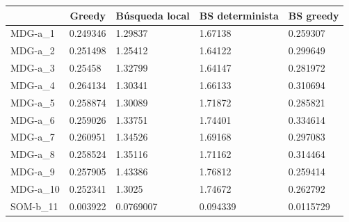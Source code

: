 \documentclass[11pt,a4paper]{article}
\begin{document}
	
	\begin{table}[H]
		\begin{tabular}{l|l|l|l|l|}
			\cline{2-5}
			& \multicolumn{1}{c|}{Greedy} & \multicolumn{1}{c|}{Búsqueda local} & \multicolumn{1}{c|}{BS determinista} & \multicolumn{1}{c|}{BS greedy} \\ \hline
			\multicolumn{1}{|l|}{MDG-a\_1}  & 0.249346                    & 1.29837                             & 1.67138                              & 0.259307                       \\ \hline
			\multicolumn{1}{|l|}{MDG-a\_2}  & 0.251498                    & 1.25412                             & 1.64122                              & 0.299649                       \\ \hline
			\multicolumn{1}{|l|}{MDG-a\_3}  & 0.25458                     & 1.32799                             & 1.64147                              & 0.281972                       \\ \hline
			\multicolumn{1}{|l|}{MDG-a\_4}  & 0.264134                    & 1.30341                             & 1.66133                              & 0.310694                       \\ \hline
			\multicolumn{1}{|l|}{MDG-a\_5}  & 0.258874                    & 1.30089                             & 1.71872                              & 0.285821                       \\ \hline
			\multicolumn{1}{|l|}{MDG-a\_6}  & 0.259026                    & 1.33751                             & 1.74401                              & 0.334614                       \\ \hline
			\multicolumn{1}{|l|}{MDG-a\_7}  & 0.260951                    & 1.34526                             & 1.69168                              & 0.297083                       \\ \hline
			\multicolumn{1}{|l|}{MDG-a\_8}  & 0.258524                    & 1.35116                             & 1.71162                              & 0.314464                       \\ \hline
			\multicolumn{1}{|l|}{MDG-a\_9}  & 0.257905                    & 1.43386                             & 1.76812                              & 0.259414                       \\ \hline
			\multicolumn{1}{|l|}{MDG-a\_10} & 0.252341                    & 1.3025                              & 1.74672                              & 0.262792                       \\ \hline
			\multicolumn{1}{|l|}{SOM-b\_11} & 0.003922                    & 0.0769007                           & 0.094339                             & 0.0115729                      \\ \hline

\end{tabular}
\end{table}
\end{document}
